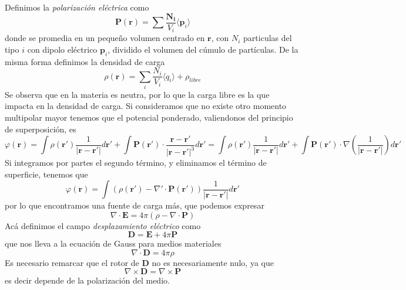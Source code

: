 \documentclass[a4paper]{article}
\numberwithin{equation}{section} %
\renewcommand{\vec}[1]{\boldsymbol{#1}}
\newcommand{\rinv}{\frac{1}{|\vec{r} - \vec{r}'|}}
\newcommand{\Rinv}{\frac{\vec{r} - \vec{r}'}{|\vec{r} - \vec{r}'|^3}}
\begin{document}
Definimos la \emph{polarización eléctrica} como
\begin{equation}
\vec{P}(\vec{r}) = \sum \frac{\vec{N_i}}{V_i} \langle \vec{p}_i \rangle
\end{equation}
donde se promedia en un pequeño volumen centrado en $\vec{r}$, con $N_i$ particulas del tipo $i$ con dipolo eléctrico $\vec{p}_i$, dividido el volumen del cúmulo de partículas. De la misma forma definimos la densidad de carga
\begin{equation}
\rho(\vec{r}) = \sum_i \frac{N_i}{V_i} \langle q_i \rangle + \rho_{libre}
\end{equation}
Se observa que en la materia es neutra, por lo que la carga libre es la que impacta en la densidad de carga.
Si consideramos que no existe otro momento multipolar mayor tenemos que el potencial ponderado, valiendonos del principio de superposición, es
\begin{equation*}
 \varphi(\vec{r}) = \int \rho(\vec{r}') \rinv d\vec{r}' + \int \vec{P}(\vec{r}') \cdot \Rinv d\vec{r}' = \int \rho(\vec{r}') \rinv d\vec{r}' + \int \vec{P}(\vec{r}') \cdot \nabla\left(\rinv\right) d\vec{r}'
\end{equation*}
Si integramos por partes el segundo término, y eliminamos el término de superficie, tenemos que
\begin{equation}
\varphi(\vec{r}) = \int (\rho(\vec{r}') - \nabla' \cdot \vec{P}(\vec{r}')) \rinv d\vec{r'}
\end{equation}
por lo que encontramos una fuente de carga más, que podemos expresar
\begin{equation*}
\nabla \cdot \vec{E} = 4\pi (\rho - \nabla \cdot \vec{P})
\end{equation*}
Acá definimos el campo \emph{desplazamiento eléctrico} como
\begin{equation}
 \vec{D} = \vec{E} + 4\pi \vec{P}
\end{equation}
que nos lleva a la ecuación de Gauss para medios materiales
\begin{equation}
 \nabla \cdot \vec{D} = 4\pi \rho
\end{equation}
Es necesario remarcar que el rotor de $\vec{D}$ no es necesariamente nulo, ya que
\begin{equation}
\nabla \times \vec{D} = \nabla \times \vec{P}
\end{equation}
es decir depende de la polarización del medio.
\end{document}
